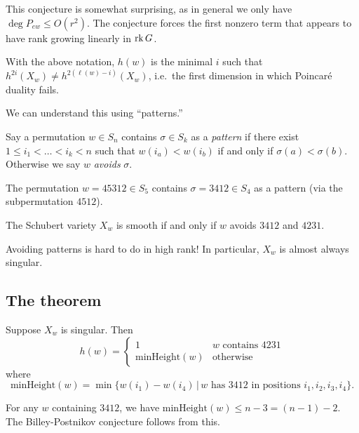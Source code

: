 \documentclass{amsart}
\begin{document}
This conjecture is somewhat surprising, as in general we only have $\deg P_{ew} \leq O(r^2)$.
The conjecture forces the first nonzero term that appears to have rank growing linearly in $\operatorname{rk} G$.

\begin{thm}
	With the above notation, $h(w)$ is the minimal $i$ such that $h^{2i}(X_w) \neq h^{2(\ell(w) - i)}(X_w)$, i.e.\ the first dimension in which Poincar\'e duality fails.
\end{thm}

We can understand this using ``patterns.''

\begin{dfn}
	Say a permutation $w \in S_n$ contains $\sigma \in S_k$ as a \emph{pattern} if there exist $1 \leq i_1 < \dots < i_k < n$ such that $w(i_a) < w(i_b)$ if and only if $\sigma(a) < \sigma(b)$.
	Otherwise we say $w$ \emph{avoids} $\sigma$.
\end{dfn}

\begin{ex}
	The permutation $w = 45312 \in S_5$ contains $\sigma = 3412 \in S_4$ as a pattern (via the subpermutation $4512$).
\end{ex}

\begin{thm}
	The Schubert variety $X_w$ is smooth if and only if $w$ avoids $3412$ and $4231$.
\end{thm}

Avoiding patterns is hard to do in high rank!
In particular, $X_w$ is almost always singular.

\subsection{The theorem}

\begin{thm}
	Suppose $X_w$ is singular.
	Then
	\[
		h(w) = \begin{cases}
			1 & \textrm{$w$ contains $4231$} \\
			\textrm{minHeight}(w) & \textrm{otherwise}
		\end{cases}
	\]
	where
	\[
		\mathrm{minHeight}(w) = \min \{ w(i_1) - w(i_4) \,|\, \textrm{$w$ has $3412$ in positions $i_1, i_2, i_3, i_4$}\}.
	\]
\end{thm}

For any $w$ containing $3412$, we have $\mathrm{minHeight}(w) \leq n - 3 = (n - 1) - 2$.
The Billey-Postnikov conjecture follows from this.
\end{document}
